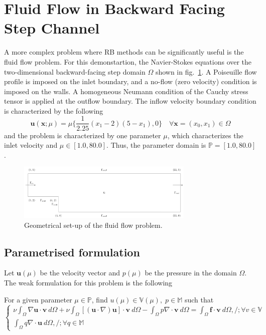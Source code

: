 \documentclass[11pt, oneside]{article}
\begin{document}
\section{Fluid Flow in Backward Facing Step Channel}
A more complex problem where RB methods can be significantly useful is the fluid flow problem. For this demonstartion, the Navier-Stokes equations over the two-dimensional backward-facing step domain $\Omega$ shown in fig.~\ref{fig:NS}. A Poiseuille flow profile is imposed on the inlet boundary, and a no-flow (zero velocity) condition is imposed on the walls. A homogeneous Neumann condition of the Cauchy stress tensor is applied at the outflow boundary. The inflow velocity boundary condition is characterized by the following
\begin{equation}
  \boldsymbol{u}(\boldsymbol{x};\mu)=\mu\bigg \{\frac{1}{2.25}(x_1-2)(5-x_1),0\bigg \} \quad \forall \boldsymbol{x}=(x_0,x_1) \in \Omega
\end{equation}
and the problem is characterized by one parameter $\mu$, which characterizes the inlet velocity and $\mu \in [1.0, 80.0]$. Thus, the parameter domain is $\mathbb{P}=[1.0,80.0]$.
\begin{figure}
    \centering
    \includegraphics[width=0.75\textwidth]{figures/channel.png}
    \caption{Geometrical set-up of the fluid flow problem.}
    \label{fig:NS}
\end{figure}

\subsection{Parametrised formulation}
Let $\boldsymbol{u}(\mu)$ be the velocity vector and $p(\mu)$ be the pressure in the domain $\Omega$. The weak formulation for this problem is the following

For a given parameter $\mu \in \mathbb{P}$, find $u(\mu) \in \mathbb{V}(\mu), \; p \in\mathbb{M}$ such that
\begin{equation}
  \begin{cases}
    \nu \int_{\Omega} \nabla \mathbf{u} \cdot \mathbf{v} \ d\Omega + \nu \int_{\Omega}[(\mathbf{u}\cdot\nabla)\mathbf{u}]\cdot\mathbf{v} \ d\Omega - \int_{\Omega} p \nabla \cdot \mathbf{v} \ d\Omega = \int_{\Omega} \mathbf{f} \cdot \mathbf{v} \ d\Omega, /; \forall v \in \mathbb{V} \\
    \int_{\Omega} q \nabla \cdot \mathbf{u} \ d\Omega, /; \forall q \in \mathbb{M}
  \end{cases}
\end{equation}
\end{document}
